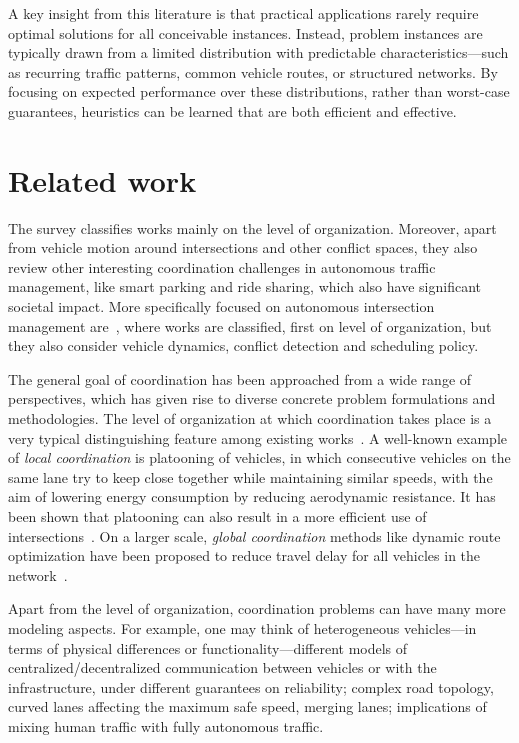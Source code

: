 \documentclass[a4paper]{report}
\theoremstyle{definition}
\theoremstyle{plain}
\begin{document}
A key insight from this literature is that practical applications rarely require optimal solutions for all conceivable instances. Instead, problem instances are typically drawn from a limited distribution with predictable characteristics—such as recurring traffic patterns, common vehicle routes, or structured networks. By focusing on expected performance over these distributions, rather than worst-case guarantees, heuristics can be learned that are both efficient and effective.

\section{Related work}


The survey \cite{marianiCoordinationAutonomousVehicles2022} classifies works
mainly on the level of organization. Moreover, apart from vehicle motion around
intersections and other conflict spaces, they also review other interesting
coordination challenges in autonomous traffic management, like smart parking and
ride sharing, which also have significant societal impact.
%
More specifically focused on autonomous intersection management
are~\cite{khayatianSurveyIntersectionManagement2020}, where works are
classified, first on level of organization, but they also consider vehicle
dynamics, conflict detection and scheduling policy.

% 
The general goal of coordination has been approached from a wide range of
perspectives, which has given rise to diverse concrete problem formulations and
methodologies.
%
The level of organization at which coordination takes place is a very typical
distinguishing feature among existing
works~\cite{marianiCoordinationAutonomousVehicles2022}.
%
A well-known example of \emph{local coordination} is platooning of vehicles, in
which consecutive vehicles on the same lane try to keep close together while
maintaining similar speeds, with the aim of lowering energy consumption by
reducing aerodynamic resistance. It has been shown that platooning can also
result in a more efficient use of
intersections~\cite{miculescuPollingsystemsbasedAutonomousVehicle2016,tachetRevisitingStreetIntersections2016,timmermanPlatoonFormingAlgorithms2021}.
On a larger scale, \emph{global coordination} methods like dynamic route
optimization have been proposed to reduce travel delay for all vehicles in the
network~\cite{rossiRoutingAutonomousVehicles2018}.

%
Apart from the level of organization, coordination problems can have many more
modeling aspects. For example, one may think of heterogeneous vehicles---in
terms of physical differences or functionality---different models of
centralized/decentralized communication between vehicles or with the
infrastructure, under different guarantees on reliability; complex road
topology, curved lanes affecting the maximum safe speed, merging lanes;
implications of mixing human traffic with fully autonomous traffic.
\end{document}
